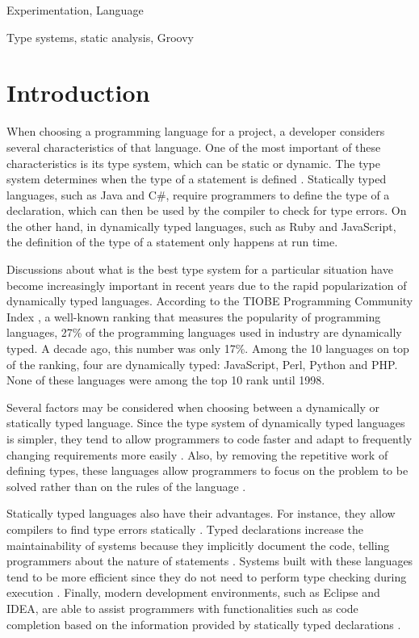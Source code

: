 \documentclass[preprint]{sigplanconf}
\begin{document}

\terms
Experimentation, Language

\keywords
Type systems, static analysis, Groovy

\section{Introduction}
When choosing a programming language for a project, a developer considers several characteristics of that language.
One of the most important of these characteristics is its type system, which can be static or dynamic.
The type system determines when the type of a statement is defined \cite{types_and_programming_languages}. 
Statically typed languages, such as Java and C\#, require programmers to define the type of a declaration, which can then be used by the compiler to check for type errors. 
On the other hand, in dynamically typed languages, such as Ruby and JavaScript, the definition of the type of a statement only happens at run time.

Discussions about what is the best type system for a particular situation have become increasingly important in recent years due to the rapid popularization of dynamically typed languages. 
According to the TIOBE Programming Community Index \cite{tiobe}, a well-known ranking that measures the popularity of programming languages, 27\% of the programming languages used in industry are dynamically typed. 
A decade ago, this number was only 17\%. 
Among the 10 languages on top of the ranking, four are dynamically typed: JavaScript, Perl, Python and PHP. 
None of these languages were among the top 10 rank until 1998.

Several factors may be considered when choosing between a dynamically or statically typed language. 
Since the type system of dynamically typed languages is simpler, they tend to allow programmers to code faster \cite{types_and_programming_languages} and adapt to frequently changing requirements more easily \cite{gradual_typing}.
Also, by removing the repetitive work of defining types, these languages allow programmers to focus on the problem to be solved rather than on the rules of the language \cite{dynamically_typed_languages}.

Statically typed languages also have their advantages. 
For instance, they allow compilers to find type errors statically \cite{should_your_specification_language_be_typed}. 
Typed declarations increase the maintainability of systems because they implicitly document the code, telling programmers about the nature of statements \cite{type_systems,mayer2012static}. 
Systems built with these languages tend to be more efficient since they do not need to perform type checking during execution \cite{bruce2002foundations,jit}. 
Finally, modern development environments, such as Eclipse and IDEA, are able to assist programmers with functionalities such as code completion based on the information provided by statically typed declarations \cite{bruch2009learning}.
\end{document}
